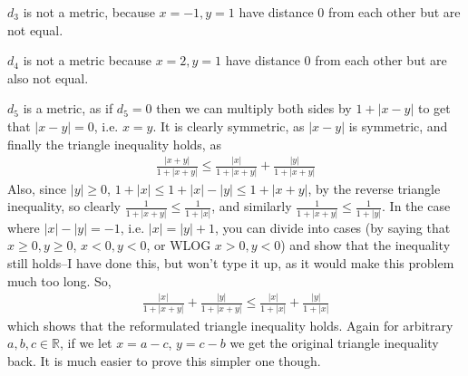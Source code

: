 \documentclass[12pt]{article}
\def\mbb#1{\mathbb{#1}}
\def \R{\mbb{R}}
\theoremstyle{definition}
\theoremstyle{remark}
\begin{document}
\begin{enumerate}[leftmargin=\labelsep]
		$d_3$ is not a metric, because $x = -1, y = 1$ have distance 0 from each other but are not equal.
		
		$d_4$ is not a metric because $x = 2, y = 1$ have distance 0 from each other but are also not equal.
		
		$d_5$ is a metric, as if $d_5 = 0$ then we can multiply both sides by $1 + |x-y|$ to get that $|x-y| = 0$, i.e. $x = y$. It is clearly symmetric, as $|x-y|$ is symmetric, and finally the triangle inequality holds, as 
		\begin{align*}
			\frac{|x+y|}{1+|x+y|} \leq \frac{|x|}{1+|x+y|} + \frac{|y|}{1+|x+y|}
		\end{align*}
		Also, since $|y| \geq 0$, $1 + |x| \leq 1 + |x| - |y| \leq 1 + |x+y|$, by the reverse triangle inequality, so clearly $\frac{1}{1+|x+y|} \leq \frac{1}{1+|x|}$, and similarly $\frac{1}{1+|x+y|} \leq \frac{1}{1+|y|}$. In the case where $|x| - |y| = -1$, i.e. $|x| = |y| + 1$, you can divide into cases (by saying that $x \geq 0, y \geq 0$, $x < 0, y < 0$, or WLOG $x > 0, y < 0$) and show that the inequality still holds--I have done this, but won't type it up, as it would make this problem much too long. So,
		\begin{align*}
			\frac{|x|}{1+|x+y|} + \frac{|y|}{1+|x+y|} \leq \frac{|x|}{1+|x|} + \frac{|y|}{1+|x|}
		\end{align*}
		which shows that the reformulated triangle inequality holds. Again for arbitrary $a, b, c \in \R$, if we let $x = a-c$, $y = c-b$ we get the original triangle inequality back. It is much easier to prove this simpler one though.
		

\end{enumerate}
\end{document}
